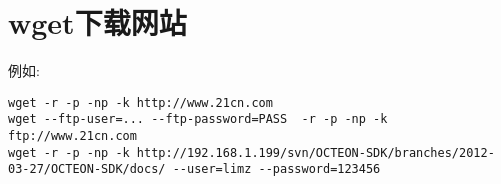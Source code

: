 \section{wget下载网站}
例如:
\begin{lstlisting}
wget -r -p -np -k http://www.21cn.com
wget --ftp-user=... --ftp-password=PASS  -r -p -np -k ftp://www.21cn.com
wget -r -p -np -k http://192.168.1.199/svn/OCTEON-SDK/branches/2012-03-27/OCTEON-SDK/docs/ --user=limz --password=123456
\end{lstlisting}


